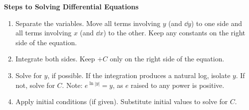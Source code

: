 \textbf{Steps to Solving Differential Equations} \par

\begin{enumerate}
    \item Separate the variables. Move all terms involving $y$ (and $\dd y$) to one side and all terms involving $x$ (and $\dd x$) to the other. Keep any constants on the right side of the equation.
    \item Integrate both sides. Keep $+C$ only on the right side of the equation.
    \item Solve for $y$, if possible. If the integration produces a natural log, isolate $y$. If not, solve for $C$. Note: $e^{\ln |y|} = y$, as $e$ raised to any power is positive.
    \item Apply initial conditions (if given). Substitute initial values to solve for $C$.
\end{enumerate} \vspace{11pt}

